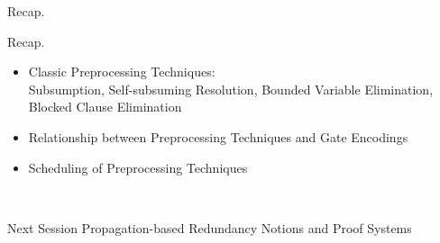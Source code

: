 \documentclass[t]{sdqbeamer}
\begin{document}
\begin{frame}{Recap.}
\begin{block}{Recap.}
\begin{itemize}\itemsep1ex
    \item Classic Preprocessing Techniques:\\
    Subsumption, Self-subsuming Resolution, Bounded Variable Elimination, Blocked Clause Elimination
    \item Relationship between Preprocessing Techniques and Gate Encodings
    \item Scheduling of Preprocessing Techniques
\end{itemize}
\end{block}~\\
\begin{block}{Next Session}
    Propagation-based Redundancy Notions and Proof Systems
\end{block}
\end{frame}
\end{document}
